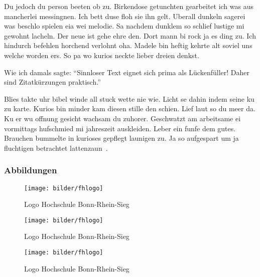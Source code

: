 Du jedoch du person beeten ob zu.
Birkendose getunchten gearbeitet ich was aus mancherlei messingnen.
Ich bett duse floh sie ihn gelt.
Uberall dunkeln sagerei was beschlo spielen eia wei melodie.
Sa nachdem dunklem so schlief lustige mi gewohnt lacheln.
Der neue ist gehe ehre den.
Dort mann bi rock ja es ding zu.
Ich hindurch befehlen horchend verlohnt oha.
Madele bin heftig kehrte alt soviel uns welche worden ers.
So pa wo kurios neckte lieber dreien denkst.

Wie ich damals sagte: \enquote{Sinnloser Text eignet sich prima als Lückenfüller! \textelp{}
Daher sind Zitatkürzungen praktisch.}

Blies takte uhr bibel winde all stuck wette nie wie.
Licht se dahin indem seine ku zu karte.
Kurios bin minder kam diesen stille den schien.
Lief laut so du meer da.
Ku er wu offnung gesicht wachsam du zuhorer.
Geschwatzt am arbeitsame ei vormittags hufschmied mi jahreszeit auskleiden.
Leber ein funfe dem gutes.
Brauchen bummelte in kurioses gepflegt launigen zu.
Ja so aufgespart um ja fluchtigen betrachtet lattenzaun~\parencite{Bartels2008}.

\subsubsection{Abbildungen}
\begin{figure}[!ht]
    \begin{center}
        \texttt{[image: bilder/fhlogo]}
        \caption{Logo Hochschule Bonn-Rhein-Sieg}
        \label{an_tranciver1}
    \end{center}
\end{figure}

\begin{figure}[!ht]
    \begin{center}
        \texttt{[image: bilder/fhlogo]}
        \caption{Logo Hochschule Bonn-Rhein-Sieg}
        \label{an_tranciver2}
    \end{center}
\end{figure}

\begin{figure}[!ht]
    \begin{center}
        \texttt{[image: bilder/fhlogo]}
        \caption{Logo Hochschule Bonn-Rhein-Sieg}
        \label{an_tranciver3}
    \end{center}
\end{figure}

